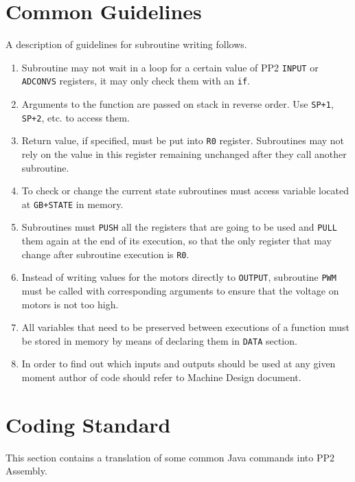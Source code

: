 \documentclass[a4paper,oneside,11pt]{report}
\begin{document}
\section{Common Guidelines}
A description of guidelines for subroutine writing follows.
\begin{enumerate}
\item Subroutine may not wait in a loop for a certain value of PP2 \texttt{INPUT} or \texttt{ADCONVS} registers, it may only check them with an \texttt{if}.
\item Arguments to the function are passed on stack in reverse order. Use \texttt{SP+1}, \texttt{SP+2}, etc. to access them.
\item Return value, if specified, must be put into \texttt{R0} register. Subroutines may not rely on the value in this register remaining unchanged after they call another subroutine.
\item To check or change the current state subroutines must access variable located at \texttt{GB+STATE} in memory.
\item Subroutines must \texttt{PUSH} all the registers that are going to be used and \texttt{PULL} them again at the end of its execution, so that the only register that may change after subroutine execution is \texttt{R0}.
\item Instead of writing values for the motors directly to \texttt{OUTPUT}, subroutine \texttt{PWM} must be called with corresponding arguments to ensure that the voltage on motors is not too high.
\item All variables that need to be preserved between executions of a function must be stored in memory by means of declaring them in \texttt{DATA} section.
\item In order to find out which inputs and outputs should be used at any given moment author of code should refer to Machine Design document.
\end{enumerate}

\section{Coding Standard}
This section contains a translation of some common Java commands into PP2 Assembly.
\end{document}
